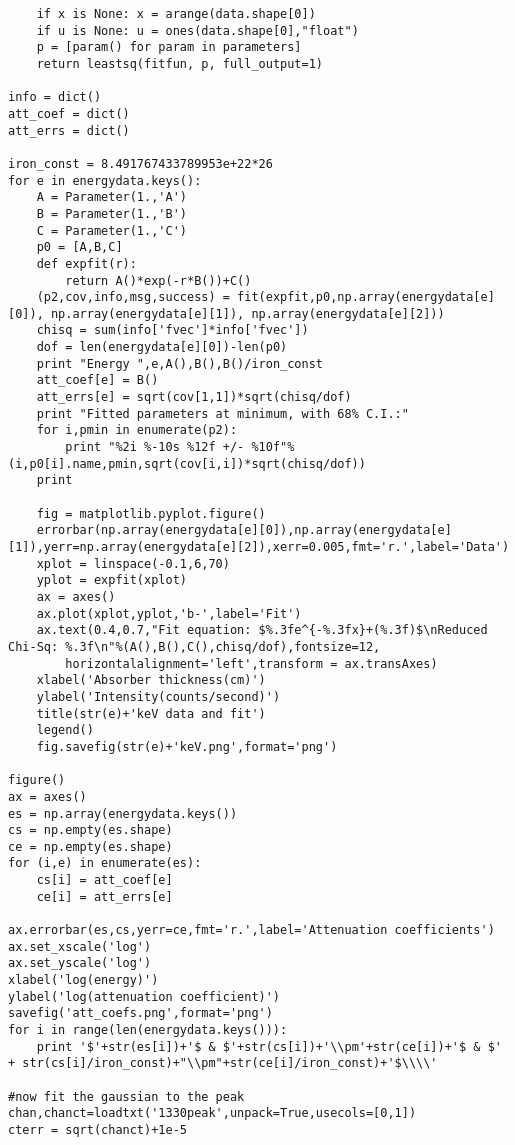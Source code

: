 \documentclass{amsart}
\begin{document}
\begin{verbatim}
    if x is None: x = arange(data.shape[0])
    if u is None: u = ones(data.shape[0],"float")
    p = [param() for param in parameters]
    return leastsq(fitfun, p, full_output=1)

info = dict()
att_coef = dict()
att_errs = dict()

iron_const = 8.491767433789953e+22*26
for e in energydata.keys():
    A = Parameter(1.,'A')
    B = Parameter(1.,'B')
    C = Parameter(1.,'C')
    p0 = [A,B,C]
    def expfit(r):
        return A()*exp(-r*B())+C()
    (p2,cov,info,msg,success) = fit(expfit,p0,np.array(energydata[e][0]), np.array(energydata[e][1]), np.array(energydata[e][2]))
    chisq = sum(info['fvec']*info['fvec'])
    dof = len(energydata[e][0])-len(p0)
    print "Energy ",e,A(),B(),B()/iron_const
    att_coef[e] = B()
    att_errs[e] = sqrt(cov[1,1])*sqrt(chisq/dof)
    print "Fitted parameters at minimum, with 68% C.I.:"
    for i,pmin in enumerate(p2):
        print "%2i %-10s %12f +/- %10f"%(i,p0[i].name,pmin,sqrt(cov[i,i])*sqrt(chisq/dof))
    print

    fig = matplotlib.pyplot.figure()
    errorbar(np.array(energydata[e][0]),np.array(energydata[e][1]),yerr=np.array(energydata[e][2]),xerr=0.005,fmt='r.',label='Data')
    xplot = linspace(-0.1,6,70)
    yplot = expfit(xplot)
    ax = axes()
    ax.plot(xplot,yplot,'b-',label='Fit')
    ax.text(0.4,0.7,"Fit equation: $%.3fe^{-%.3fx}+(%.3f)$\nReduced Chi-Sq: %.3f\n"%(A(),B(),C(),chisq/dof),fontsize=12,
        horizontalalignment='left',transform = ax.transAxes)
    xlabel('Absorber thickness(cm)')
    ylabel('Intensity(counts/second)')
    title(str(e)+'keV data and fit')
    legend()
    fig.savefig(str(e)+'keV.png',format='png')
    
figure()
ax = axes()
es = np.array(energydata.keys())
cs = np.empty(es.shape)
ce = np.empty(es.shape)
for (i,e) in enumerate(es):
    cs[i] = att_coef[e]
    ce[i] = att_errs[e]

ax.errorbar(es,cs,yerr=ce,fmt='r.',label='Attenuation coefficients')
ax.set_xscale('log')
ax.set_yscale('log')
xlabel('log(energy)')
ylabel('log(attenuation coefficient)')
savefig('att_coefs.png',format='png')
for i in range(len(energydata.keys())):
    print '$'+str(es[i])+'$ & $'+str(cs[i])+'\\pm'+str(ce[i])+'$ & $' + str(cs[i]/iron_const)+"\\pm"+str(ce[i]/iron_const)+'$\\\\'

#now fit the gaussian to the peak
chan,chanct=loadtxt('1330peak',unpack=True,usecols=[0,1])
cterr = sqrt(chanct)+1e-5


\end{verbatim}
\end{document}
